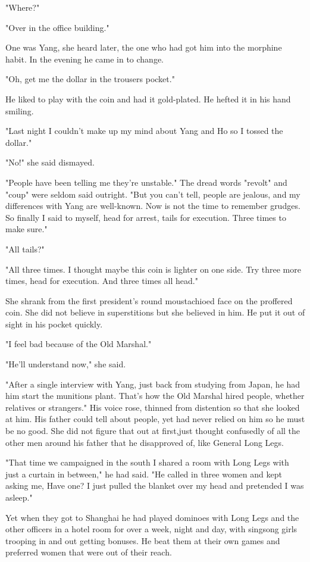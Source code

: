 \par "Where?"
\par "Over in the office building."
\par One was Yang, she heard later, the one who had got him into the morphine habit. In the evening he came in to change.
\par "Oh, get me the dollar in the trousers pocket."
\par He liked to play with the coin and had it gold-plated. He hefted it in his hand smiling.
\par "Last night I couldn't make up my mind about Yang and Ho so I tossed the dollar."
\par "No!" she said dismayed.
\par "People have been telling me they're unstable." The dread words "revolt" and "coup" were seldom said outright. "But you can't tell, people are jealous, and my differences with Yang are well-known. Now is not the time to remember grudges. So finally I said to myself, head for arrest, tails for execution. Three times to make sure."
\par "All tails?"
\par "All three times. I thought maybe this coin is lighter on one side. Try three more times, head for execution. And three times all head."
\par She shrank from the first president's round moustachioed face on the proffered coin. She did not believe in superstitions but she believed in him. He put it out of sight in his pocket quickly.
\par "I feel bad because of the Old Marshal."
\par "He'll understand now," she said.
\par "After a single interview with Yang, just back from studying from Japan, he had him start the munitions plant. That's how the Old Marshal hired people, whether relatives or strangers." His voice rose, thinned from distention so that she looked at him. His father could tell about people, yet had never relied on him so he must be no good. She did not figure that out at first,just thought confusedly of all the other men around his father that he disapproved of, like General Long Legs.
\par "That time we campaigned in the south I shared a room with Long Legs with just a curtain in between," he had said. "He called in three women and kept asking me, Have one? I just pulled the blanket over my head and pretended I was asleep."
\par Yet when they got to Shanghai he had played dominoes with Long Legs and the other officers in a hotel room for over a week, night and day, with singsong girls trooping  in and out getting bonuses. He beat them at their own games and preferred women that were out of their reach.
